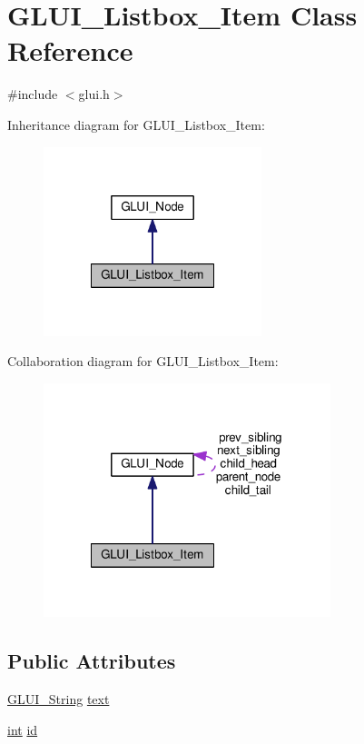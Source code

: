 \hypertarget{class_g_l_u_i___listbox___item}{\section{G\+L\+U\+I\+\_\+\+Listbox\+\_\+\+Item Class Reference}
\label{class_g_l_u_i___listbox___item}
}


{\ttfamily \#include $<$glui.\+h$>$}



Inheritance diagram for G\+L\+U\+I\+\_\+\+Listbox\+\_\+\+Item\+:\nopagebreak
\begin{figure}[H]
\begin{center}
\leavevmode
\includegraphics[width=180pt]{class_g_l_u_i___listbox___item__inherit__graph}
\end{center}
\end{figure}


Collaboration diagram for G\+L\+U\+I\+\_\+\+Listbox\+\_\+\+Item\+:\nopagebreak
\begin{figure}[H]
\begin{center}
\leavevmode
\includegraphics[width=237pt]{class_g_l_u_i___listbox___item__coll__graph}
\end{center}
\end{figure}
\subsection*{Public Attributes}
\begin{DoxyCompactItemize}
\item 
\hyperlink{glui_8h_aada824856f7bcf29794719981ebd8f60}{G\+L\+U\+I\+\_\+\+String} \hyperlink{class_g_l_u_i___listbox___item_a93ab7eacdaf81a43b07b89e60bc5edbe}{text}
\item 
\hyperlink{wglext_8h_a500a82aecba06f4550f6849b8099ca21}{int} \hyperlink{class_g_l_u_i___listbox___item_a82c3decf8704010c91232ad6e2ea95d9}{id}
\end{DoxyCompactItemize}
